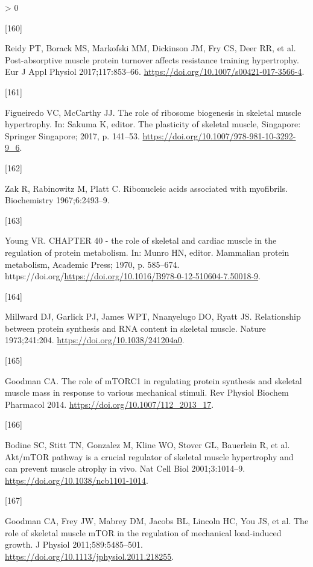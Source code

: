 \documentclass[twoside,10pt]{gihclass} %
\newlength{\cslhangindent}
\newlength{\csllabelwidth}
\newenvironment{CSLReferences}[3] %
 {%
  \setlength{\parindent}{0pt}
  \ifodd #1 \everypar{\setlength{\hangindent}{\cslhangindent}}\ignorespaces\fi
  \ifnum #2 > 0
  \setlength{\parskip}{#2\baselineskip}
  \fi
 }%
 {}
\newcommand{\CSLLeftMargin}[1]{\parbox[t]{\maxof{\widthof{#1}}{\csllabelwidth}}{#1}}
\newcommand{\CSLRightInline}[1]{\parbox[t]{\linewidth}{#1}}
\begin{document}
\begin{CSLReferences}{0}{0}
\leavevmode\hypertarget{ref-RN1897}{}%
\CSLLeftMargin{{[}160{]} }
\CSLRightInline{Reidy PT, Borack MS, Markofski MM, Dickinson JM, Fry CS, Deer RR, et al. Post-absorptive muscle protein turnover affects resistance training hypertrophy. Eur J Appl Physiol 2017;117:853--66. \url{https://doi.org/10.1007/s00421-017-3566-4}.}

\leavevmode\hypertarget{ref-RN1912}{}%
\CSLLeftMargin{{[}161{]} }
\CSLRightInline{Figueiredo VC, McCarthy JJ. The role of ribosome biogenesis in skeletal muscle hypertrophy. In: Sakuma K, editor. The plasticity of skeletal muscle, Singapore: Springer Singapore; 2017, p. 141--53. \url{https://doi.org/10.1007/978-981-10-3292-9_6}.}

\leavevmode\hypertarget{ref-RN2054}{}%
\CSLLeftMargin{{[}162{]} }
\CSLRightInline{Zak R, Rabinowitz M, Platt C. Ribonucleic acids associated with myofibrils. Biochemistry 1967;6:2493--9.}

\leavevmode\hypertarget{ref-RN2223}{}%
\CSLLeftMargin{{[}163{]} }
\CSLRightInline{Young VR. CHAPTER 40 - the role of skeletal and cardiac muscle in the regulation of protein metabolism. In: Munro HN, editor. Mammalian protein metabolism, Academic Press; 1970, p. 585--674. https://doi.org/\url{https://doi.org/10.1016/B978-0-12-510604-7.50018-9}.}

\leavevmode\hypertarget{ref-RN2145}{}%
\CSLLeftMargin{{[}164{]} }
\CSLRightInline{Millward DJ, Garlick PJ, James WPT, Nnanyelugo DO, Ryatt JS. Relationship between protein synthesis and RNA content in skeletal muscle. Nature 1973;241:204. \url{https://doi.org/10.1038/241204a0}.}

\leavevmode\hypertarget{ref-RN1049}{}%
\CSLLeftMargin{{[}165{]} }
\CSLRightInline{Goodman CA. The role of mTORC1 in regulating protein synthesis and skeletal muscle mass in response to various mechanical stimuli. Rev Physiol Biochem Pharmacol 2014. \url{https://doi.org/10.1007/112_2013_17}.}

\leavevmode\hypertarget{ref-RN782}{}%
\CSLLeftMargin{{[}166{]} }
\CSLRightInline{Bodine SC, Stitt TN, Gonzalez M, Kline WO, Stover GL, Bauerlein R, et al. Akt/mTOR pathway is a crucial regulator of skeletal muscle hypertrophy and can prevent muscle atrophy in vivo. Nat Cell Biol 2001;3:1014--9. \url{https://doi.org/10.1038/ncb1101-1014}.}

\leavevmode\hypertarget{ref-RN1072}{}%
\CSLLeftMargin{{[}167{]} }
\CSLRightInline{Goodman CA, Frey JW, Mabrey DM, Jacobs BL, Lincoln HC, You JS, et al. The role of skeletal muscle mTOR in the regulation of mechanical load-induced growth. J Physiol 2011;589:5485--501. \url{https://doi.org/10.1113/jphysiol.2011.218255}.}


\end{CSLReferences}
\end{document}
